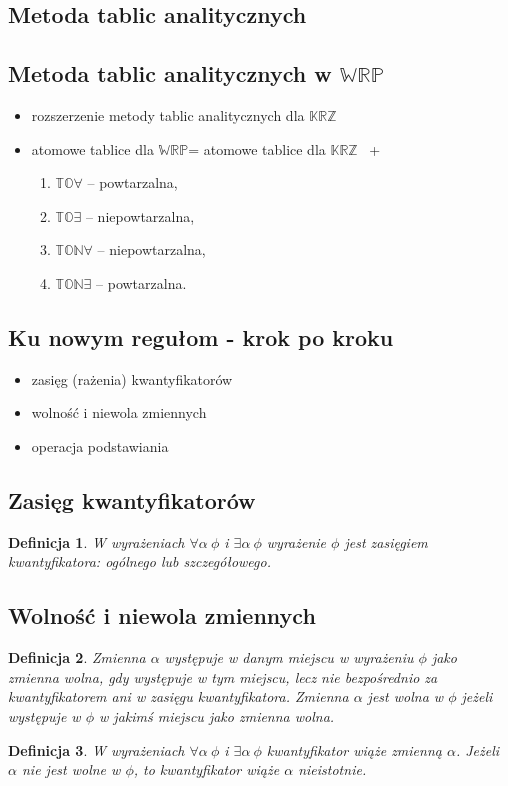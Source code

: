 \documentclass[12pt]{article}
\newtheorem{definicja}{Definicja}
\newcommand {\KRZ} {\ensuremath{\mathbb{KRZ}}}
\newcommand {\WRP} {\ensuremath{\mathbb{WRP}}}
\begin{document}
\subsection{Metoda tablic analitycznych}

\subsection{Metoda tablic analitycznych w \WRP}
%
\begin{itemize}
\item rozszerzenie metody tablic analitycznych dla \KRZ
%
\item atomowe tablice dla \WRP = atomowe tablice  dla \KRZ~ +
%
\begin{enumerate}
\item $\mathbb{TO} \forall$ -- powtarzalna,
\item $\mathbb{TO}\exists$ -- niepowtarzalna,
\item $\mathbb{TON}\forall$ -- niepowtarzalna,
\item $\mathbb{TON}\exists$ -- powtarzalna.
\end{enumerate}
\end{itemize}
%

\subsection{Ku nowym regułom - krok po kroku}
%
\begin{itemize}
\item zasięg (rażenia) kwantyfikatorów
\item wolność i niewola zmiennych
\item operacja podstawiania
\end{itemize}
%

\subsection{Zasięg kwantyfikatorów}
%
\begin{definicja}
\label{zasieg}
W wyrażeniach $\forall \alpha~\phi$ i $\exists \alpha~\phi$ wyrażenie $\phi$ jest \emph{zasięgiem} kwantyfikatora: ogólnego lub szczegółowego.
\end{definicja}
%


\subsection{Wolność i niewola zmiennych}
%
\begin{definicja}
\label{wolnosc}
Zmienna $\alpha$ występuje w danym miejscu w wyrażeniu $\phi$ \emph{jako zmienna wolna}, gdy występuje w tym miejscu, lecz nie bezpośrednio za kwantyfikatorem ani w zasięgu kwantyfikatora. Zmienna $\alpha$\emph{ jest wolna} w $\phi$ jeżeli występuje w $\phi$ w jakimś miejscu jako zmienna wolna.
\end{definicja}
%
\begin{definicja}
W wyrażeniach $\forall \alpha~\phi$ i $\exists \alpha~\phi$ kwantyfikator \emph{wiąże} zmienną $\alpha$. Jeżeli $\alpha$ nie jest wolne w $\phi$, to kwantyfikator wiąże $\alpha$ \emph{nieistotnie}.
\end{definicja}
%
\end{document}
